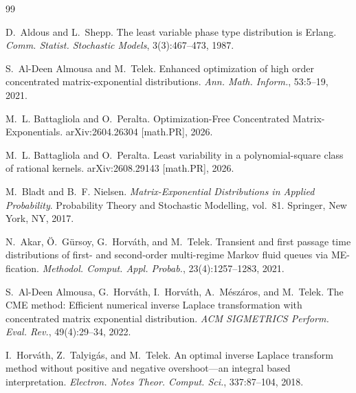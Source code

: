 \documentclass[11pt]{article}
\numberwithin{equation}{section}
\theoremstyle{remark}
\begin{document}
\begin{thebibliography}{99}

D.~Aldous and L.~Shepp.
\newblock The least variable phase type distribution is Erlang.
\newblock \emph{Comm. Statist. Stochastic Models}, 3(3):467--473, 1987.

S.~Al-Deen Almousa and M.~Telek.
\newblock Enhanced optimization of high order concentrated matrix-exponential distributions.
\newblock \emph{Ann. Math. Inform.}, 53:5--19, 2021.

M.~L. Battagliola and O.~Peralta.
\newblock Optimization-Free Concentrated Matrix-Exponentials.
\newblock arXiv:2604.26304 [math.PR], 2026.

M.~L. Battagliola and O.~Peralta.
\newblock Least variability in a polynomial-square class of rational kernels.
\newblock arXiv:2608.29143 [math.PR], 2026.

M.~Bladt and B.~F. Nielsen.
\newblock \emph{Matrix-Exponential Distributions in Applied Probability}.
\newblock Probability Theory and Stochastic Modelling, vol.~81. Springer,
New York, NY, 2017.

N.~Akar, \"O.~G\"ursoy, G.~Horv\'ath, and M.~Telek.
\newblock Transient and first passage time distributions of first- and second-order multi-regime Markov fluid queues via ME-fication.
\newblock \emph{Methodol. Comput. Appl. Probab.}, 23(4):1257--1283, 2021.

S.~Al-Deen Almousa, G.~Horv\'ath, I.~Horv\'ath, A.~M\'esz\'aros, and M.~Telek.
\newblock The CME method: Efficient numerical inverse Laplace transformation with concentrated matrix exponential distribution.
\newblock \emph{ACM SIGMETRICS Perform. Eval. Rev.}, 49(4):29--34, 2022.

I.~Horv\'ath, Z.~Talyig\'as, and M.~Telek.
\newblock An optimal inverse Laplace transform method without positive and negative overshoot---an integral based interpretation.
\newblock \emph{Electron. Notes Theor. Comput. Sci.}, 337:87--104, 2018.


\end{thebibliography}
\end{document}
